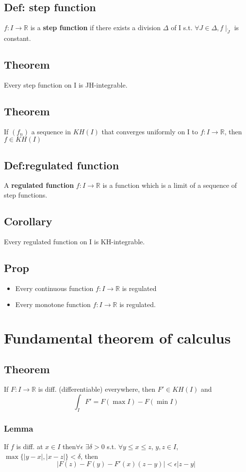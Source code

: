 \documentclass{book}
\newcommand{\abs}[1]{\left\lvert #1 \right\rvert}
\begin{document}
\section{Def: step function}
$f:I\rightarrow\mathbb R$ is a \textbf{step function} if there exists a division $\Delta$ of I s.t. $\forall J\in \Delta,f\mid_{\mathring J}$ is constant.
\section{Theorem}
Every step function on I is JH-integrable.
\section{Theorem}
If $(f_n)$ a sequence in $KH(I)$ that converges uniformly on I to $f:I\rightarrow\mathbb R$, then $f\in KH(I)$
\section{Def:regulated function}
A \textbf{regulated function} $f:I\rightarrow\mathbb R$ is a function which is a limit of a sequence of step functions.
\section{Corollary}Every regulated function on I is KH-integrable.
\section{Prop}
\begin{itemize}
    \item Every continuous function $f:I\rightarrow\mathbb R$ is regulated
    \item Every monotone function $f:I\rightarrow\mathbb R$ is regulated.
\end{itemize}
\chapter{Fundamental theorem of calculus}
\section{Theorem}
If $F:I\rightarrow\mathbb R$ is diff. (differentiable) everywhere, then $F'\in KH(I)$ and $$\int_IF'=F(\max I)-F(\min I)$$
\subsection{Lemma}
\label{Lemma 2.52}
If $f$ is diff. at $x\in I$ then$\forall\epsilon$ $\exists\delta>0$ s.t. $\forall y\leq x\leq z$, $y,z\in I$, $\max\{\abs{y-x},\abs{x-z}\}<\delta$, then$$\abs{F(z)-F(y)-F'(x)(z-y)}<\epsilon\abs{z-y}$$
\end{document}
